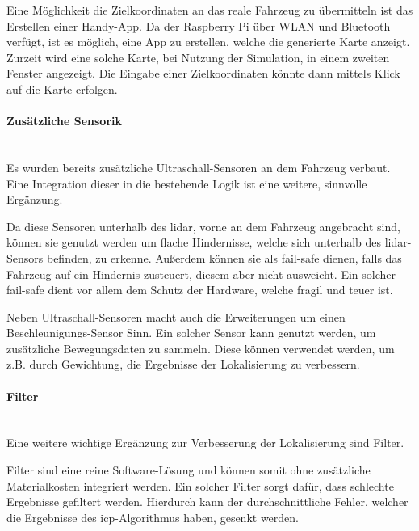Eine Möglichkeit die Zielkoordinaten an das reale Fahrzeug zu übermitteln ist das Erstellen einer Handy-App.
Da der Raspberry Pi über WLAN und Bluetooth verfügt, ist es möglich, eine App zu erstellen, welche die generierte Karte anzeigt.
Zurzeit wird eine solche Karte, bei Nutzung der Simulation, in einem zweiten Fenster angezeigt.
Die Eingabe einer Zielkoordinaten könnte dann mittels Klick auf die Karte erfolgen.

\paragraph{Zusätzliche Sensorik} \mbox{}\\
Es wurden bereits zusätzliche Ultraschall-Sensoren an dem Fahrzeug verbaut.
Eine Integration dieser in die bestehende Logik ist eine weitere, sinnvolle Ergänzung.

Da diese Sensoren unterhalb des \ac{lidar}, vorne an dem Fahrzeug angebracht sind,
können sie genutzt werden um flache Hindernisse, welche sich unterhalb des \ac{lidar}-Sensors befinden, zu erkenne.
Außerdem können sie als fail-safe dienen, falls das Fahrzeug auf ein Hindernis zusteuert, diesem aber nicht ausweicht.
Ein solcher fail-safe dient vor allem dem Schutz der Hardware, welche fragil und teuer ist.

Neben Ultraschall-Sensoren macht auch die Erweiterungen um einen Beschleunigungs-Sensor Sinn.
Ein solcher Sensor kann genutzt werden, um zusätzliche Bewegungsdaten zu sammeln.
Diese können verwendet werden, um z.B. durch Gewichtung, die Ergebnisse der Lokalisierung zu verbessern.

\paragraph{Filter} \mbox{}\\
Eine weitere wichtige Ergänzung zur Verbesserung der Lokalisierung sind Filter.

Filter sind eine reine Software-Lösung und können somit ohne zusätzliche Materialkosten integriert werden.
Ein solcher Filter sorgt dafür, dass schlechte Ergebnisse gefiltert werden.
Hierdurch kann der durchschnittliche Fehler, welcher die Ergebnisse des \ac{icp}-Algorithmus haben, gesenkt werden.

\newpage

